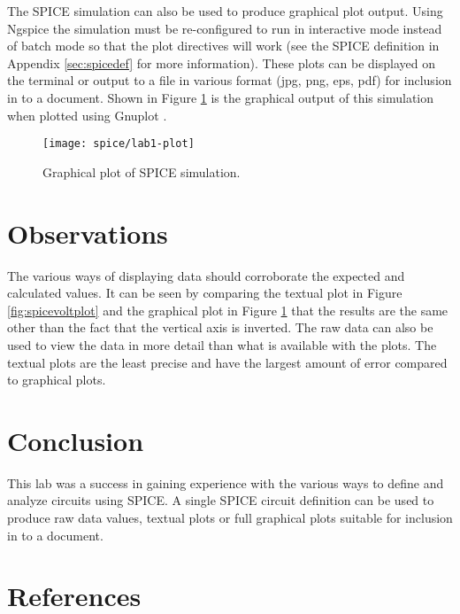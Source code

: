 \documentclass{article}
\begin{document}
The SPICE simulation can also be used to produce graphical plot output.
Using Ngspice the simulation must be re-configured to run in interactive
mode instead of batch mode so that the plot directives will work
(see the SPICE definition in Appendix \ref{sec:spicedef} for more information).
These plots can be displayed on the terminal or output to a file in various
format (jpg, png, eps, pdf) for inclusion in to a document.
Shown in Figure \ref{fig:spiceguiplot} is the graphical output
of this simulation when plotted using Gnuplot \cite{GNUPLOT}.

\begin{figure}[!hbtp]
\center
\texttt{[image: spice/lab1-plot]}
\caption{Graphical plot of SPICE simulation.}
\label{fig:spiceguiplot}
\end{figure}

\clearpage

\section{Observations}

The various ways of displaying data should corroborate the expected
and calculated values.
It can be seen by comparing the textual plot in Figure \ref{fig:spicevoltplot}
and the graphical plot in Figure \ref{fig:spiceguiplot} that the results
are the same other than the fact that the vertical axis is inverted.
The raw data can also be used to view the data in more detail than what
is available with the plots.
The textual plots are the least precise and have the largest amount of error 
compared to graphical plots.

\section{Conclusion}

This lab was a success in gaining experience with the various ways
to define and analyze circuits using SPICE.
A single SPICE circuit definition can be used to produce raw data values,
textual plots or full graphical plots suitable for inclusion in to a document.

\clearpage

\pagebreak
\renewcommand*{\refname}{\vspace{-8mm}}
\section{References}


\end{document}
